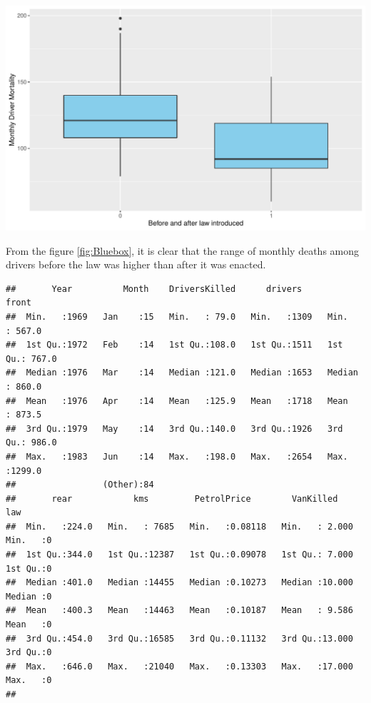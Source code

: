 \documentclass[11pt,a4paper,]{article}
\begin{document}
\includegraphics{report_files/figure-latex/Bluebox-1.pdf}

From the figure \ref{fig:Bluebox}, it is clear that the range of monthly deaths among drivers before the law was higher than after it was enacted.

\begin{verbatim}
##       Year          Month    DriversKilled      drivers         front       
##  Min.   :1969   Jan    :15   Min.   : 79.0   Min.   :1309   Min.   : 567.0  
##  1st Qu.:1972   Feb    :14   1st Qu.:108.0   1st Qu.:1511   1st Qu.: 767.0  
##  Median :1976   Mar    :14   Median :121.0   Median :1653   Median : 860.0  
##  Mean   :1976   Apr    :14   Mean   :125.9   Mean   :1718   Mean   : 873.5  
##  3rd Qu.:1979   May    :14   3rd Qu.:140.0   3rd Qu.:1926   3rd Qu.: 986.0  
##  Max.   :1983   Jun    :14   Max.   :198.0   Max.   :2654   Max.   :1299.0  
##                 (Other):84                                                  
##       rear            kms         PetrolPrice        VanKilled           law   
##  Min.   :224.0   Min.   : 7685   Min.   :0.08118   Min.   : 2.000   Min.   :0  
##  1st Qu.:344.0   1st Qu.:12387   1st Qu.:0.09078   1st Qu.: 7.000   1st Qu.:0  
##  Median :401.0   Median :14455   Median :0.10273   Median :10.000   Median :0  
##  Mean   :400.3   Mean   :14463   Mean   :0.10187   Mean   : 9.586   Mean   :0  
##  3rd Qu.:454.0   3rd Qu.:16585   3rd Qu.:0.11132   3rd Qu.:13.000   3rd Qu.:0  
##  Max.   :646.0   Max.   :21040   Max.   :0.13303   Max.   :17.000   Max.   :0  
## 
\end{verbatim}
\end{document}
